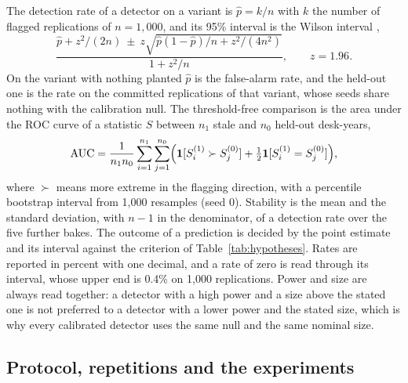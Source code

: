 The detection rate of a detector on a variant is $\hat p=k/n$ with $k$ the number of flagged replications of $n=1{,}000$, and its 95\% interval is the Wilson interval \citep{wilson1927},
\begin{equation}
\frac{\hat p+z^2/(2n)\ \pm\ z\sqrt{\hat p(1-\hat p)/n+z^2/(4n^2)}}{1+z^2/n},\qquad z=1.96.
\label{eq:wilson}
\end{equation}
On the variant with nothing planted $\hat p$ is the false-alarm rate, and the held-out one is the rate on the committed replications of that variant, whose seeds share nothing with the calibration null.
The threshold-free comparison is the area under the ROC curve of a statistic $S$ between $n_1$ stale and $n_0$ held-out desk-years,
\begin{equation}
\mathrm{AUC}=\frac{1}{n_1n_0}\sum_{i=1}^{n_1}\sum_{j=1}^{n_0}\Bigl(\mathbf{1}[S_i^{(1)}\succ S_j^{(0)}]+\tfrac12\mathbf{1}[S_i^{(1)}=S_j^{(0)}]\Bigr),
\label{eq:auc}
\end{equation}
where $\succ$ means more extreme in the flagging direction, with a percentile bootstrap interval from 1,000 resamples (seed 0).
Stability is the mean and the standard deviation, with $n-1$ in the denominator, of a detection rate over the five further bakes.
The outcome of a prediction is decided by the point estimate and its interval against the criterion of Table~\ref{tab:hypotheses}.
Rates are reported in percent with one decimal, and a rate of zero is read through its interval, whose upper end is 0.4\% on 1,000 replications.
Power and size are always read together: a detector with a high power and a size above the stated one is not preferred to a detector with a lower power and the stated size, which is why every calibrated detector uses the same null and the same nominal size.

\subsection{Protocol, repetitions and the experiments}
\label{sec:design-protocol}

